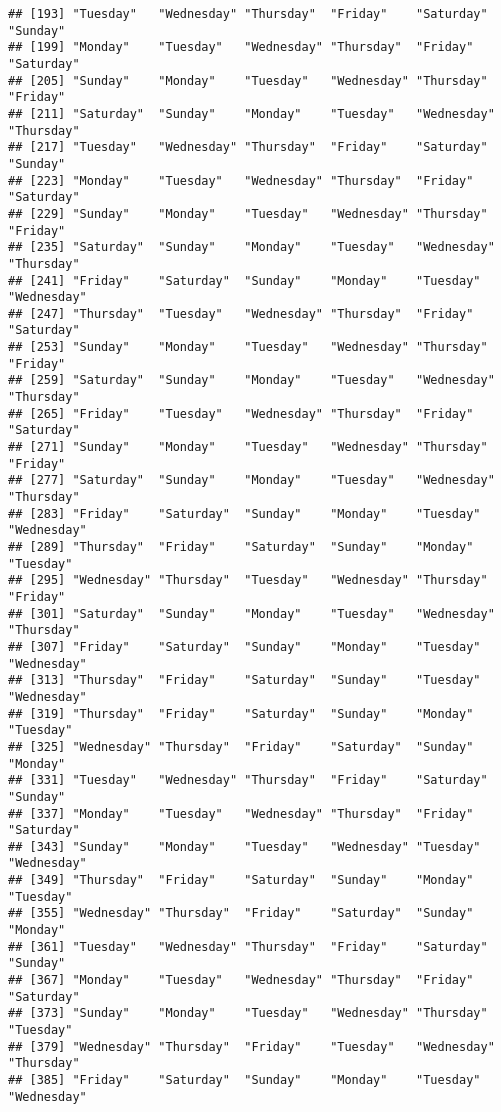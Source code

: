 \documentclass[
]{article}
\begin{document}
\begin{verbatim}
## [193] "Tuesday"   "Wednesday" "Thursday"  "Friday"    "Saturday"  "Sunday"   
## [199] "Monday"    "Tuesday"   "Wednesday" "Thursday"  "Friday"    "Saturday" 
## [205] "Sunday"    "Monday"    "Tuesday"   "Wednesday" "Thursday"  "Friday"   
## [211] "Saturday"  "Sunday"    "Monday"    "Tuesday"   "Wednesday" "Thursday" 
## [217] "Tuesday"   "Wednesday" "Thursday"  "Friday"    "Saturday"  "Sunday"   
## [223] "Monday"    "Tuesday"   "Wednesday" "Thursday"  "Friday"    "Saturday" 
## [229] "Sunday"    "Monday"    "Tuesday"   "Wednesday" "Thursday"  "Friday"   
## [235] "Saturday"  "Sunday"    "Monday"    "Tuesday"   "Wednesday" "Thursday" 
## [241] "Friday"    "Saturday"  "Sunday"    "Monday"    "Tuesday"   "Wednesday"
## [247] "Thursday"  "Tuesday"   "Wednesday" "Thursday"  "Friday"    "Saturday" 
## [253] "Sunday"    "Monday"    "Tuesday"   "Wednesday" "Thursday"  "Friday"   
## [259] "Saturday"  "Sunday"    "Monday"    "Tuesday"   "Wednesday" "Thursday" 
## [265] "Friday"    "Tuesday"   "Wednesday" "Thursday"  "Friday"    "Saturday" 
## [271] "Sunday"    "Monday"    "Tuesday"   "Wednesday" "Thursday"  "Friday"   
## [277] "Saturday"  "Sunday"    "Monday"    "Tuesday"   "Wednesday" "Thursday" 
## [283] "Friday"    "Saturday"  "Sunday"    "Monday"    "Tuesday"   "Wednesday"
## [289] "Thursday"  "Friday"    "Saturday"  "Sunday"    "Monday"    "Tuesday"  
## [295] "Wednesday" "Thursday"  "Tuesday"   "Wednesday" "Thursday"  "Friday"   
## [301] "Saturday"  "Sunday"    "Monday"    "Tuesday"   "Wednesday" "Thursday" 
## [307] "Friday"    "Saturday"  "Sunday"    "Monday"    "Tuesday"   "Wednesday"
## [313] "Thursday"  "Friday"    "Saturday"  "Sunday"    "Tuesday"   "Wednesday"
## [319] "Thursday"  "Friday"    "Saturday"  "Sunday"    "Monday"    "Tuesday"  
## [325] "Wednesday" "Thursday"  "Friday"    "Saturday"  "Sunday"    "Monday"   
## [331] "Tuesday"   "Wednesday" "Thursday"  "Friday"    "Saturday"  "Sunday"   
## [337] "Monday"    "Tuesday"   "Wednesday" "Thursday"  "Friday"    "Saturday" 
## [343] "Sunday"    "Monday"    "Tuesday"   "Wednesday" "Tuesday"   "Wednesday"
## [349] "Thursday"  "Friday"    "Saturday"  "Sunday"    "Monday"    "Tuesday"  
## [355] "Wednesday" "Thursday"  "Friday"    "Saturday"  "Sunday"    "Monday"   
## [361] "Tuesday"   "Wednesday" "Thursday"  "Friday"    "Saturday"  "Sunday"   
## [367] "Monday"    "Tuesday"   "Wednesday" "Thursday"  "Friday"    "Saturday" 
## [373] "Sunday"    "Monday"    "Tuesday"   "Wednesday" "Thursday"  "Tuesday"  
## [379] "Wednesday" "Thursday"  "Friday"    "Tuesday"   "Wednesday" "Thursday" 
## [385] "Friday"    "Saturday"  "Sunday"    "Monday"    "Tuesday"   "Wednesday"

\end{verbatim}
\end{document}
